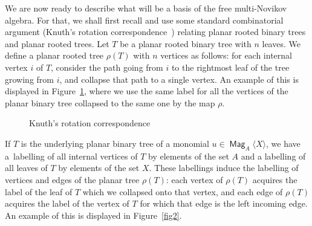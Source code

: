 \documentclass[AHL,Unicode,longabstracts]{cedram}
\DeclareMathOperator{\Mag}{\mathsf{Mag}}
\begin{document}
We are now ready to describe what will be a basis of the free multi-Novikov algebra. For that, we shall first recall and use some standard combinatorial argument (Knuth's rotation correspondence~\cite[Chapter~2.3]{Kn}) relating planar rooted binary trees and planar rooted trees. Let $T$ be a planar rooted binary tree with $n$ leaves. We define a planar rooted tree $\rho(T)$ with $n$ vertices as follows: for each internal vertex $i$ of $T$, consider the path going from $i$ to the rightmost leaf of the tree growing from $i$, and collapse that path to a single vertex. An example of this is displayed in Figure~\ref{fig1}, where we use the same label for all the vertices of the planar binary tree collapsed to the same one by the map $\rho$.
\begin{figure}[h]
\centering
{}
\caption{Knuth's rotation correspondence}\label{fig1}
\end{figure}

\goodbreak
If $T$ is the underlying planar binary tree of a monomial $u\in \Mag_A\langle X\rangle$, we have a~labelling of all internal vertices of $T$ by elements of the set $A$ and a labelling of all leaves of $T$ by elements of the set $X$. These labellings induce the labelling of vertices and edges of the planar tree $\rho(T)$: each vertex of $\rho(T)$ acquires the label of the leaf of $T$ which we collapsed onto that vertex, and each edge of $\rho(T)$ acquires the label of the vertex of $T$ for which that edge is the left incoming edge. An example of this is displayed in Figure~\ref{fig2}.
\end{document}
